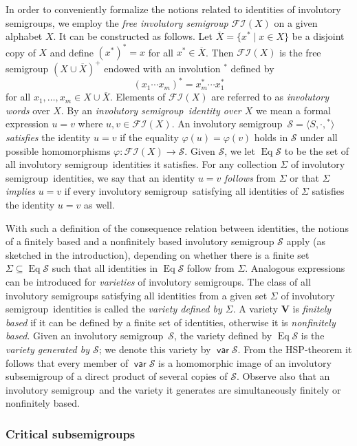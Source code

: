 \documentclass[preprint,1p,times]{elsarticle}
\DeclareMathOperator{\var}{\mathsf{var}}
\DeclareMathOperator{\Id}{Eq}
\numberwithin{equation}{section}
\theoremstyle{remark}
\def\cal{\mathcal}
\def\Sc{{\cal S}}
\def\Vc{\mathbf{V}}
\def\Si{\Sigma}
\def\sm{semi\-group}
\def\FI{\ensuremath{\mathcal{FI}}}
\begin{document}
In order to conveniently formalize the notions related to identities of involutory semigroups, we employ the \emph{free
involutory semigroup} $\FI(X)$ on a given alphabet $X$. It can be constructed as follows.  Let $\overline{X}=\{x^*\mid
x\in X\}$ be a disjoint copy of $X$ and define $(x^*)^*=x$ for all $x^*\in \overline{X}$. Then $\FI(X)$ is the free
semigroup $(X\cup\overline{X})^+$ endowed with an involution ${}^*$ defined by
$$(x_1\cdots x_m)^* = x_m^*\cdots x_1^*$$
for all $x_1,\dots,x_m\in X\cup \overline{X}$. Elements of $\FI(X)$ are referred to as \emph{involutory words} over
$X$. By an \emph{involutory \sm\ identity over $X$} we mean a formal expression $u=v$ where $u,v\in\FI(X)$. An
involutory \sm\ $\mathcal{S}=\langle S,\cdot,{}^*\rangle$ \emph{satisfies} the identity $u=v$ if the equality
$\varphi(u)=\varphi(v)$ holds in $\mathcal{S}$ under all possible homomorphisms $\varphi:\FI(X) \to\mathcal{S}$. Given
$\mathcal{S}$, we let $\Id \mathcal{S}$ to be the set of all involutory \sm\ identities it satisfies. For any
collection $\Sigma$ of involutory \sm\ identities, we say that an identity $u=v$ \emph{follows} from $\Sigma$ or that
$\Sigma$ \emph{implies} $u=v$ if every involutory \sm\ satisfying all identities of $\Sigma$ satisfies the identity
$u=v$ as well.

With such a definition of the consequence relation between identities, the notions of a finitely based and a
nonfinitely based involutory semigroup $\mathcal{S}$ apply (as sketched in the introduction), depending on whether
there is a finite set $\Si\subseteq\Id \mathcal{S}$ such that all identities in $\Id \mathcal{S}$ follow from $\Si$.
Analogous expressions can be introduced for \emph{varieties} of involutory semigroups. The class of all involutory
semigroups satisfying all identities from a given set $\Sigma$ of involutory \sm\ identities is called the
\emph{variety defined by $\Sigma$}. A variety $\Vc$ is \emph{finitely based} if it can be defined by a finite set of
identities, otherwise it is \emph{nonfinitely based}. Given an involutory \sm\ $\mathcal{S}$, the variety defined by
$\Id\Sc$ is the \emph{variety generated by $\Sc$}; we denote this variety by $\var\Sc$. From the HSP-theorem it follows
that every member of $\var\Sc$ is a homomorphic image of an involutory subsemigroup of a direct product of several
copies of $\Sc$. Observe also that an involutory \sm\ and the variety it generates are simultaneously finitely or
nonfinitely based.

\subsubsection{Critical subsemigroups}\label{critical}
\end{document}
